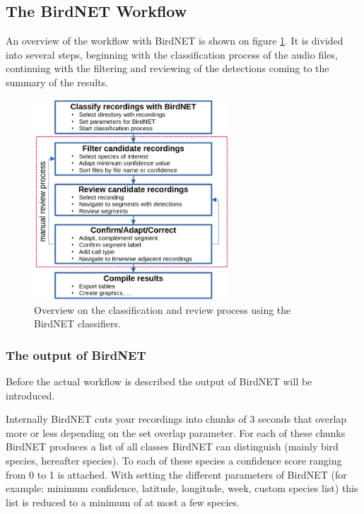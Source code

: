 \documentclass{scrartcl}
\begin{document}

\newpage
\subsection{The BirdNET Workflow}\label{sec:BirdNET}
An overview of the workflow with BirdNET is shown on figure \ref{fig:workflow}.
It is divided into several steps, beginning with the classification process of the audio files, continuing with  the filtering and reviewing of the detections coming to the summary of the results.

\begin{figure}[htpb]
	\centering
	\includegraphics[width=0.65\textwidth]{Figures/BirdNET_Workflow.png}
	\caption{Overview on the classification and review process using the BirdNET classifiers.}
	\label{fig:workflow}
\end{figure}

\subsubsection{The output of BirdNET}
Before the actual workflow is described the output of BirdNET will be introduced. 

Internally BirdNET cuts your recordings into chunks of 3 seconds that overlap more or less depending on the set overlap parameter.
For each of these chunks BirdNET produces a list of all classes BirdNET can distinguish (mainly bird species, hereafter species).
To each of these species a confidence score ranging from 0 to 1 is attached.
With setting the different parameters of BirdNET (for example: minimum confidence, latitude, longitude, week, custom species list) this list is reduced to a minimum of at most a few species. 
\end{document}
